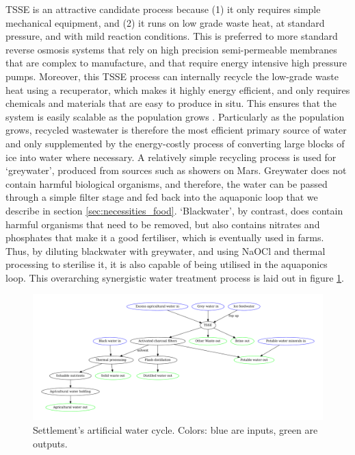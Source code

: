 \documentclass[fleqn,10pt]{Stylesheet} %
\begin{document}
TSSE is an attractive candidate process because (1) it only requires simple mechanical equipment, and (2) it runs on low grade waste heat, at standard pressure, and with mild reaction conditions. This is preferred to more standard reverse osmosis systems that rely on high precision semi-permeable membranes that are complex to manufacture, and that require energy intensive high pressure pumps. Moreover, this TSSE process can internally recycle the low-grade waste heat using a recuperator, which makes it highly energy efficient, and only requires chemicals and materials that are easy to produce in situ. This ensures that the system is easily scalable as the population grows \cite{ChanheeBoo2019}. Particularly as the population grows, recycled wastewater is therefore the most efficient primary source of water and only supplemented by the energy-costly process of converting large blocks of ice into water where necessary. A relatively simple recycling process is used for `greywater', produced from sources such as showers on Mars. Greywater does not contain harmful biological organisms, and therefore, the water can be passed through a simple filter stage and fed back into the aquaponic loop that we describe in section \ref{sec:necessities_food}. `Blackwater', by contrast, does contain harmful organisms that need to be removed, but also contains nitrates and phosphates that make it a good fertiliser, which is eventually used in farms. Thus, by diluting blackwater with greywater, and using NaOCl and thermal processing to sterilise it, it is also capable of being utilised in the aquaponics loop. This overarching synergistic water treatment process is laid out in figure \ref{fig:water_diagram}.

\begin{figure}
    \centering
    \includegraphics[width=\linewidth]{figures/fig_water.pdf}
    \caption{Settlement's artificial water cycle. Colors: blue are inputs, green are outputs.}
    \label{fig:water_diagram}
\end{figure}
\end{document}
